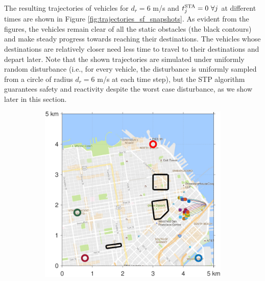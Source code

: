 The resulting trajectories of vehicles for $d_{r} = 6$ m/s and $t^\text{STA}_j = 0 ~ \forall j$ at different times are shown in Figure \ref{fig:trajectories_sf_snapshots}. As evident from the figures, the vehicles remain clear of all the static obstacles (the black contours) and make steady progress towards reaching their destinations. The vehicles whose destinations are relatively closer need less time to travel to their destinations and depart later. Note that the shown trajectories are simulated under uniformly random disturbance (i.e., for every vehicle, the disturbance is uniformly sampled from a circle of radius $d_{r} = 6$ m/s at each time step), but the STP algorithm guarantees safety and reactivity despite the worst case disturbance, as we show later in this section.
%
\begin{figure}[!htb]
 \centering
\begin{subfigure}{0.5\textwidth}
  \includegraphics[width=\columnwidth]{figs/sf_d6sep0_s1}
  \subcaption{}
  \label{fig:sf_d6sep0_s1}
\end{subfigure}%
\begin{subfigure}{0.5\textwidth}

\end{subfigure}
\end{figure}
